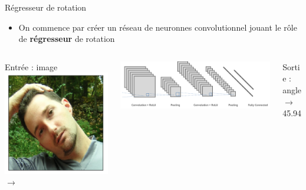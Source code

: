 \documentclass[compress]{beamer}
\begin{document}
\begin{frame}{Régresseur de rotation}
  \begin{itemize}
    \item On commence par créer un réseau de neuronnes convolutionnel jouant le rôle de \textbf{\color{fibeamer@orange}régresseur} de rotation
  \end{itemize}
  \begin{columns}
    \begin{column}{0.15\linewidth}\scriptsize
      \centering Entrée : image\\
      \includegraphics[width=\linewidth]{resources/rotation3} $\rightarrow$
    \end{column}
    \begin{column}{0.7\linewidth}
      \includegraphics[width=\linewidth]{resources/convolutional_neural_network}
    \end{column}
    \begin{column}{0.15\linewidth}\scriptsize
      Sortie : angle\\
      $\rightarrow$ 45.94
    \end{column}
  \end{columns}
\end{frame}
\end{document}
